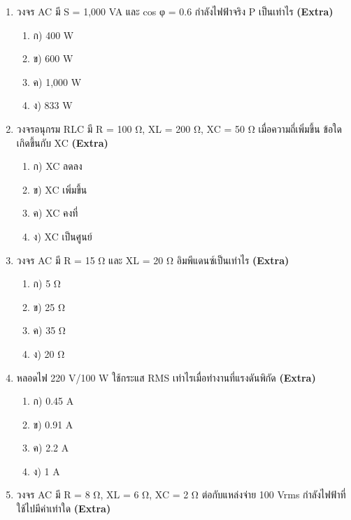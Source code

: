 \documentclass[12pt]{article}
\begin{document}
\begin{enumerate}[label=\arabic*.]
\begin{enumerate}[label=)]
\item ก) เปลี่ยนทิศทาง 25 ครั้งต่อวินาที
\item ข) เปลี่ยนทิศทาง 100 ครั้งต่อวินาที
\item ค) เปลี่ยนทิศทาง 50 ครั้งต่อวินาที
\item ง) เปลี่ยนทิศทาง 60 ครั้งต่อวินาที
\end{enumerate}
\item วงจร AC มี S = 1,000 VA และ cos φ = 0.6 กำลังไฟฟ้าจริง P เป็นเท่าไร \hfill \textbf{\small (Extra)}
\begin{enumerate}[label=)]
\item ก) 400 W
\item ข) 600 W
\item ค) 1,000 W
\item ง) 833 W
\end{enumerate}
\item วงจรอนุกรม RLC มี R = 100 Ω, XL = 200 Ω, XC = 50 Ω เมื่อความถี่เพิ่มขึ้น ข้อใดเกิดขึ้นกับ XC \hfill \textbf{\small (Extra)}
\begin{enumerate}[label=)]
\item ก) XC ลดลง
\item ข) XC เพิ่มขึ้น
\item ค) XC คงที่
\item ง) XC เป็นศูนย์
\end{enumerate}
\item วงจร AC มี R = 15 Ω และ XL = 20 Ω อิมพีแดนซ์เป็นเท่าไร \hfill \textbf{\small (Extra)}
\begin{enumerate}[label=)]
\item ก) 5 Ω
\item ข) 25 Ω
\item ค) 35 Ω
\item ง) 20 Ω
\end{enumerate}
\item หลอดไฟ 220 V/100 W ใช้กระแส RMS เท่าไรเมื่อทำงานที่แรงดันพิกัด \hfill \textbf{\small (Extra)}
\begin{enumerate}[label=)]
\item ก) 0.45 A
\item ข) 0.91 A
\item ค) 2.2 A
\item ง) 1 A
\end{enumerate}
\item วงจร AC มี R = 8 Ω, XL = 6 Ω, XC = 2 Ω ต่อกับแหล่งจ่าย 100 Vrms กำลังไฟฟ้าที่ใช้ไปมีค่าเท่าใด \hfill \textbf{\small (Extra)}
\begin{enumerate}[label=)]

\end{enumerate}
\end{enumerate}
\end{document}
